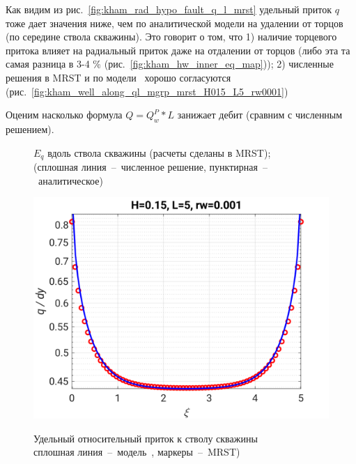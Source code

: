 \documentclass{article}
\begin{document}
Как видим из рис.~\ref{fig:kham_rad_hypo_fault_q_l_mrst} удельный приток $q$ тоже дает значения ниже, чем по аналитической модели на удалении от торцов (по середине ствола скважины). Это говорит о том, что 1) наличие торцевого притока влияет на радиальный приток даже на отдалении от торцов (либо эта та самая разница в 3-4 \% (рис.~\ref{fig:kham_hw_inner_eq_map})); 2) численные решения в MRST и по модели~\cite{lit:kham_mazo_uzku_2015} хорошо согласуются (рис.~\ref{fig:kham_well_along_ql_mgrp_mrst_H015_L5_rw0001})

Оценим насколько формула $Q = Q_w^P * L$ занижает дебит (сравним с численным решением).

\begin{figure}[h!]
\centering
\begin{subfigure}{0.48\textwidth}

\caption{}
\label{fig:kham_Rq_map_L0.5_mrst}
\end{subfigure}
\hfill
\begin{subfigure}{0.48\textwidth}

\caption{}
\label{fig:kham_Rq_map_L1_mrst}
\end{subfigure}

\begin{subfigure}{0.48\textwidth}

\caption{}
\label{fig:kham_Rq_map_L5_mrst}
\end{subfigure}
\hfill
\begin{subfigure}{0.48\textwidth}

\caption{}
\label{fig:kham_Rq_map_L10_mrst}
\end{subfigure}

\caption{
$E_q$ вдоль ствола скважины (расчеты сделаны в MRST);
\\ (сплошная линия~--~численное решение, пунктирная~--~аналитическое)
}
\label{fig:kham_Rq_map_mrst}
\end{figure}

\begin{figure}[!ht]
\centering
\includegraphics[width=0.7\linewidth]{images/hw/kham_well_along_ql_mgrp_mrst_H015_L5_rw0001.svg}
\label{fig:kham_well_along_ql_H015_L5_rw0001_mgrp_mrst}
\caption{Удельный относительный приток к стволу скважины \\
сплошная линия~--~модель~\cite{lit:kham_mazo_uzku_2015}, маркеры~--~MRST)}
\end{figure}
\end{document}
